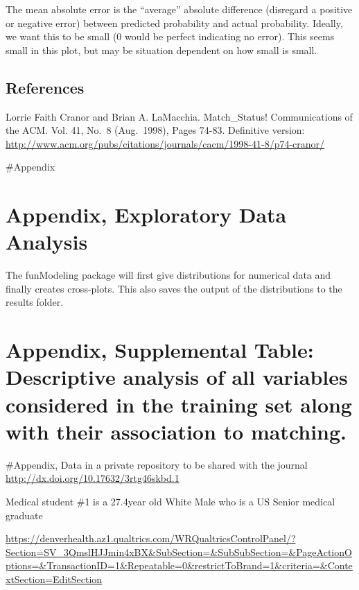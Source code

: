 \documentclass[12pt,]{article}
\begin{document}
The mean absolute error is the ``average'' absolute difference
(disregard a positive or negative error) between predicted probability
and actual probability. Ideally, we want this to be small (0 would be
perfect indicating no error). This seems small in this plot, but may be
situation dependent on how small is small.

\pagebreak

\hypertarget{references}{%
\subsection{References}\label{references}}

Lorrie Faith Cranor and Brian A. LaMacchia. Match\_Status!
Communications of the ACM. Vol. 41, No.~8 (Aug.~1998), Pages 74-83.
Definitive version:
\url{http://www.acm.org/pubs/citations/journals/cacm/1998-41-8/p74-cranor/}

\pagebreak \#Appendix

\hypertarget{appendix-exploratory-data-analysis}{%
\section{Appendix, Exploratory Data
Analysis}\label{appendix-exploratory-data-analysis}}

The funModeling package will first give distributions for numerical data
and finally creates cross-plots. This also saves the output of the
distributions to the results folder.

\hypertarget{appendix-supplemental-table-descriptive-analysis-of-all-variables-considered-in-the-training-set-along-with-their-association-to-matching.}{%
\section{Appendix, Supplemental Table: Descriptive analysis of all
variables considered in the training set along with their association to
matching.}\label{appendix-supplemental-table-descriptive-analysis-of-all-variables-considered-in-the-training-set-along-with-their-association-to-matching.}}

\#Appendix, Data in a private repository to be shared with the journal
\url{http://dx.doi.org/10.17632/3rtg46skbd.1}

Medical student \#1 is a 27.4year old White Male who is a US Senior
medical graduate

\url{https://denverhealth.az1.qualtrics.com/WRQualtricsControlPanel/?Section=SV_3QmslHJJmin4xBX\&SubSection=\&SubSubSection=\&PageActionOptions=\&TransactionID=1\&Repeatable=0\&restrictToBrand=1\&criteria=\&ContextSection=EditSection}
\end{document}

